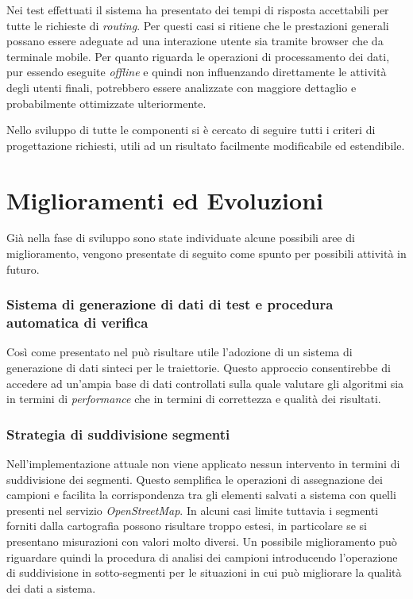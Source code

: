 Nei test effettuati il sistema ha presentato dei tempi di risposta accettabili per tutte le richieste di \emph{routing}. Per questi casi si ritiene che le prestazioni generali possano essere adeguate ad una interazione utente sia tramite browser che da terminale mobile. Per quanto riguarda le operazioni di processamento dei dati, pur essendo eseguite \emph{offline} e quindi non influenzando direttamente le attività degli utenti finali, potrebbero essere analizzate con maggiore dettaglio e probabilmente ottimizzate ulteriormente.

Nello sviluppo di tutte le componenti si è cercato di seguire tutti i criteri di progettazione richiesti, utili ad un risultato facilmente modificabile ed estendibile.

\section{Miglioramenti ed Evoluzioni}
Già nella fase di sviluppo sono state individuate alcune possibili aree di miglioramento, vengono presentate di seguito come spunto per possibili attività in futuro.
\subsubsection{Sistema di generazione di dati di test e procedura automatica di verifica}
Così come presentato nel \cite[capitolo~3.4]{mdme} può risultare utile l'adozione di un sistema di generazione di dati sinteci per le traiettorie. Questo approccio consentirebbe di accedere ad un'ampia base di dati controllati sulla quale valutare gli algoritmi sia in termini di \emph{performance} che in termini di correttezza e qualità dei risultati.

\subsubsection{Strategia di suddivisione segmenti}
Nell'implementazione attuale non viene applicato nessun intervento in termini di suddivisione dei segmenti. Questo semplifica le operazioni di assegnazione dei campioni e facilita la corrispondenza tra gli elementi salvati a sistema con quelli presenti nel servizio \emph{OpenStreetMap}. In alcuni casi limite tuttavia i segmenti forniti dalla cartografia possono risultare troppo estesi, in particolare se si presentano misurazioni con valori molto diversi. Un possibile miglioramento può riguardare quindi la procedura di analisi dei campioni introducendo l'operazione di suddivisione in sotto-segmenti per le situazioni in cui può migliorare la qualità dei dati a sistema.

